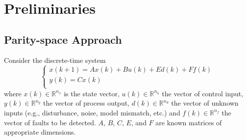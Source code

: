 \documentclass[A4paper,conference]{IEEEtran}
\begin{document}
\section{Preliminaries}\label{sec2}

\subsection{Parity-space Approach}
Consider the discrete-time system
\begin{equation*}
\left \{\begin{array}{l}
 x(k+1)=Ax(k)+Bu(k)+Ed(k)+Ff(k) \\
 y(k)=Cx(k) \\ %
 \end{array}\right.
\end{equation*}
where $x(k)\in \mathbb{R}^{n_x}$ is the state vector, $u(k)\in
\mathbb{R}^{n_u}$ the vector of control input, $y(k)\in
\mathbb{R}^{n_y}$ the vector of process output, $d(k)\in
\mathbb{R}^{n_d}$ the vector of unknown inputs (e.g., disturbance,
noise, model mismatch, etc.) and $f(k)\in \mathbb{R}^{n_f}$ the
vector of faults to be detected. $A$, $B$, $C$, $E$, and $F$ are
known matrices of appropriate dimensions.
\end{document}
